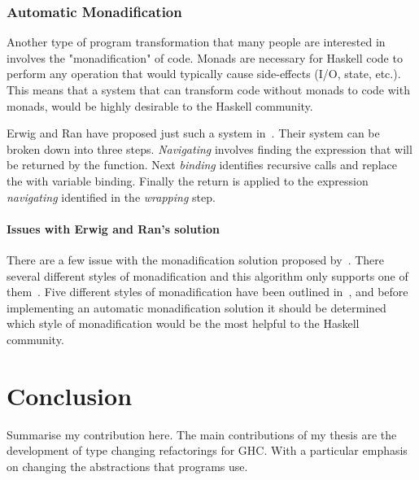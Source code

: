 \subsection{Automatic Monadification}\label{erwigMonad}

Another type of program transformation that many people are interested in involves the "monadification" of code. Monads are necessary for Haskell code to perform any operation that would typically cause side-effects (I/O, state, etc.). This means that a system that can transform code without monads to code with monads, would be highly desirable to the Haskell community.

Erwig and Ran have proposed just such a system in~\citep{monadification}. Their system can be broken down into three steps. \textit{Navigating} involves finding the expression that will be returned by the function. Next \textit{binding} identifies recursive calls and replace the with variable binding. Finally the return is applied to the expression \textit{navigating} identified in the \textit{wrapping} step.

\subsubsection{Issues with Erwig and Ran's solution}

There are a few issue with the monadification solution proposed by~\citep{monadification}. There several different styles of monadification and this algorithm only supports one of them~\citep{clausMonadResponse}. Five different styles of monadification have been outlined in~\citep{monadSurvey}, and before implementing an automatic monadification solution it should be determined which style of monadification would be the most helpful to the Haskell community.

\chapter{Conclusion}
Summarise my contribution here. The main contributions of my thesis are the development of type changing refactorings for GHC. With a particular emphasis on changing the abstractions that programs use.



\cleardoublepage
{}
\label{index}
\printindex


